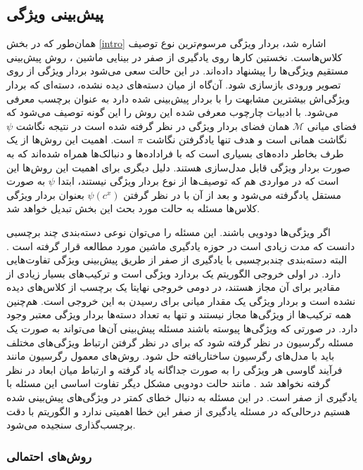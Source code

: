 \subsection{پیش‌بینی ویژگی}
همان‌طور که در بخش \ref{intro} اشاره شد، بردار ویژگی مرسوم‌ترین نوع توصیف کلاس‌هاست. نخستین کارها روی یادگیری از صفر در بینایی ماشین \cite{lampert09, farhadi09}،
روش پیش‌بینی مستقیم ویژگی‌ها را پیشنهاد داده‌اند. در این حالت سعی می‌شود بردار ویژگی از روی تصویر ورودی بازسازی شود. آن‌گاه از میان دسته‌های دیده نشده، دسته‌ای که بردار ویژگی‌اش بیشترین مشابهت را با بردار پیش‌بینی شده دارد به عنوان برچسب معرفی می‌شود. با ادبیات چارچوب معرفی شده این روش را این گونه توصیف می‌شود که فضای میانی  $ \mathcal{M} $ همان فضای بردار ویژگی در نظر گرفته شده است در نتیجه نگاشت $\psi$ نگاشت همانی است و هدف تنها یادگرفتن نگاشت $\pi$ است. اهمیت این روش‌ها از یک طرف بخاطر داده‌های بسیاری است که با فراداده‌ها  و دنبالک‌ها  همراه شده‌اند که به صورت بردار ویژگی قابل مدل‌سازی هستند. دلیل دیگری برای اهمیت این روش‌ها این است که در مواردی هم که توصیف‌ها از نوع بردار ویژگی نیستند، ابتدا $\psi$ به صورت مستقل یادگرفته می‌شود و بعد از آن با در نظر گرفتن   $ \psi(c^x) $ بعنوان بردار ویژگی کلاس‌ها مسئله به حالت مورد بحث این بخش تبدیل خواهد شد.  

 
 اگر ویژگی‌ها دودویی باشند. این مسئله را می‌توان نوعی دسته‌بندی چند برچسبی  دانست که مدت زیادی است در حوزه یادگیری ماشین مورد مطالعه قرار گرفته است \cite{multilabel}. البته دسته‌بندی چندبرچسبی با یادگیری از صفر از طریق پیش‌بینی ویژگی تفاوت‌هایی دارد. در اولی خروجی الگوریتم یک بردارد ویژگی است و ترکیب‌های بسیار زیادی از مقادیر برای آن مجاز هستند، در دومی خروجی نهایتا یک برچسب از کلاس‌های دیده نشده است و بردار ویژگی یک مقدار میانی برای رسیدن به این خروجی است. هم‌چنین همه ترکیب‌ها از ویژگی‌ها مجاز نیستند و تنها به تعداد دسته‌ها بردار ویژگی معتبر وجود دارد. در صورتی که ویژگی‌ها پیوسته باشند مسئله پیش‌بینی آن‌ها می‌تواند به صورت یک مسئله رگرسیون در نظر گرفته شود که برای در نظر گرفتن ارتباط ویژگی‌های مختلف باید با مدل‌های 
 رگرسیون ساختاریافته  \cite{elements} حل شود. روش‌های معمول رگرسیون مانند فرآیند گاوسی هر ویژگی را به صورت جداگانه یاد گرفته و ارتباط میان ابعاد در نظر گرفته نخواهد شد \cite{mohamed13}. مانند حالت دودویی مشکل دیگر تفاوت اساسی این مسئله با یادگیری از صفر است. در این مسئله به دنبال خطای کمتر در ویژگی‌های پیش‌بینی شده هستیم درحالی‌که در مسئله یادگیری از صفر این خطا اهمیتی ندارد و الگوریتم با دقت برچسب‌گذاری سنجیده می‌شود. 
\subsubsection{روش‌های احتمالی}\label{prob}

